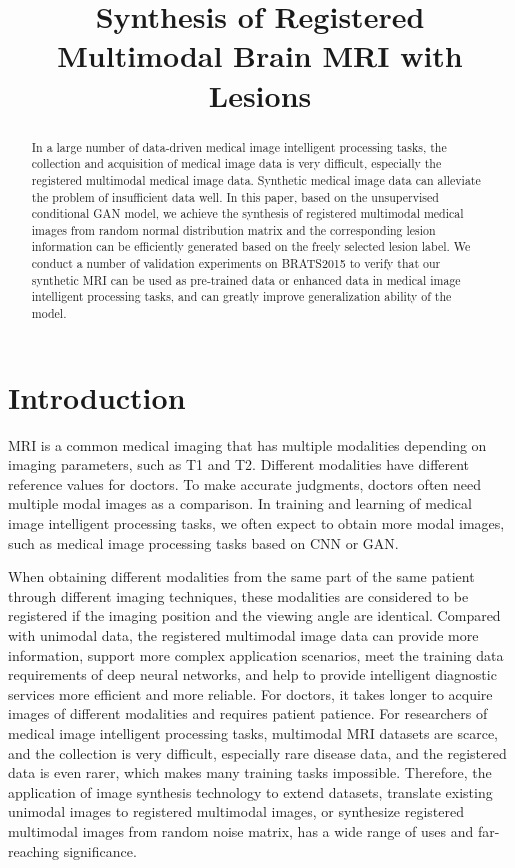 \documentclass[letterpaper]{article} %
\title{Synthesis of Registered Multimodal Brain MRI with Lesions}
\begin{document}
\maketitle

\begin{abstract}
In a large number of data-driven medical image intelligent processing tasks, the collection and acquisition of medical image data is very difficult, especially the registered multimodal medical image data. Synthetic medical image data can alleviate the problem of insufficient data well. In this paper, based on the unsupervised conditional GAN model, we achieve the synthesis of registered multimodal medical images from random normal distribution matrix and the corresponding lesion information can be efficiently generated based on the freely selected lesion label. We conduct a number of validation experiments on BRATS2015 to verify that our synthetic MRI can be used as pre-trained data or enhanced data in medical image intelligent processing tasks, and can greatly improve generalization ability of the model.
\end{abstract}
	
\section{Introduction}
MRI is a common medical imaging that has multiple modalities depending on imaging parameters, such as T1 and T2. Different modalities have different reference values for doctors. To make accurate judgments, doctors often need multiple modal images as a comparison. In training and learning of medical image intelligent processing tasks, we often expect to obtain more modal images, such as medical image processing tasks based on CNN\cite{86krizhevsky2012imagenet} or GAN\cite{25goodfellow2014generative}. 

When obtaining different modalities from the same part of the same patient through different imaging techniques, these modalities are considered to be registered if the imaging position and the viewing angle are identical. Compared with unimodal data, the registered multimodal image data can provide more information, support more complex application scenarios, meet the training data requirements of deep neural networks, and help to provide intelligent diagnostic services more efficient and more reliable. For doctors, it takes longer to acquire images of different modalities and requires patient patience. For researchers of medical image intelligent processing tasks, multimodal MRI datasets are scarce, and the collection is very difficult, especially rare disease data, and the registered data is even rarer, which makes many training tasks impossible. Therefore, the application of image synthesis technology to extend datasets, translate existing unimodal images to registered multimodal images, or synthesize registered multimodal images from random noise matrix, has a wide range of uses and far-reaching significance.
\end{document}
